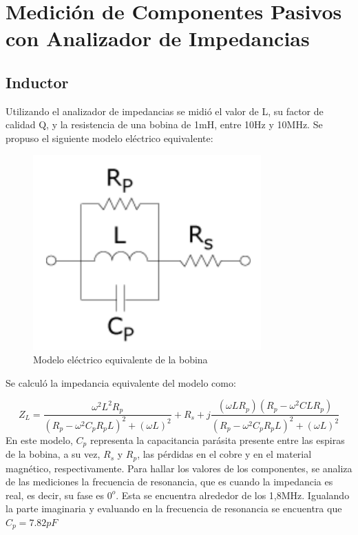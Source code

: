 



\onehalfspacing



\section{Medición de Componentes Pasivos con Analizador de Impedancias}
\subsection{Inductor}
Utilizando el analizador de impedancias se midió el valor de L, su factor de calidad Q, y la resistencia de una bobina de 1mH, entre 10Hz y 10MHz.
Se propuso el siguiente modelo eléctrico equivalente:
\begin{figure}[h!]
\centering
\includegraphics[scale=0.5]{modeloL.png}
\caption{Modelo eléctrico equivalente de la bobina}
\label{fig:modeloL}
\end{figure}
Se calculó la impedancia equivalente del modelo como:

\begin{equation}
Z_L=\frac{\omega^2L^2R_p}{(R_p-\omega^2C_pR_pL)^2+(\omega L)^2}+R_s+j\frac{(\omega LR_p)(R_p-\omega^2 CLR_p)}{(R_p-\omega^2C_pR_pL)^2+(\omega L)^2}
\end{equation}
En este modelo, $C_p$  representa la capacitancia parásita presente entre las espiras de la bobina, a su vez, $R_s$ y $R_p$, las pérdidas en el cobre y en el material magnético, respectivamente.
Para hallar los valores de los componentes, se analiza de las mediciones la frecuencia de resonancia, que es cuando la impedancia es real, es decir, su fase es $0^o$. Esta se encuentra alrededor de los 1,8MHz.
Igualando la parte imaginaria y evaluando en la frecuencia de resonancia se encuentra que $C_p=7.82pF$


